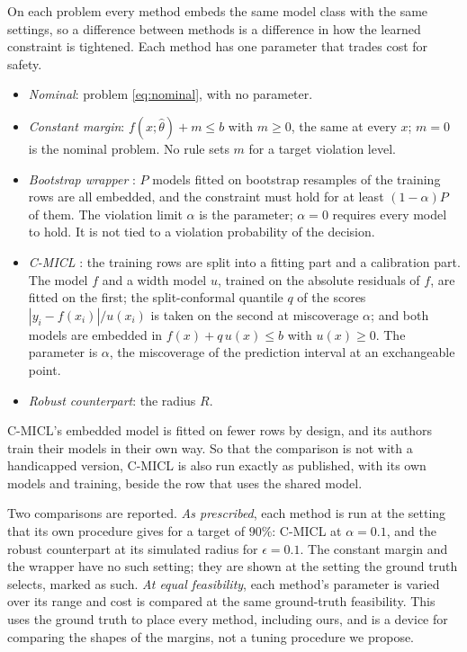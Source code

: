 On each problem every method embeds the same model class with the same
settings, so a difference between methods is a difference in how the learned
constraint is tightened. Each method has one parameter that trades cost for
safety.
\begin{itemize}
  \item \emph{Nominal}: problem \eqref{eq:nominal}, with no parameter.
  \item \emph{Constant margin}: $f(x;\hat\theta) + m \le b$ with $m \ge 0$,
    the same at every $x$; $m = 0$ is the nominal problem. No rule sets $m$
    for a target violation level.
  \item \emph{Bootstrap wrapper} \citep{maragno2025mixed}: $P$ models fitted
    on bootstrap resamples of the training rows are all embedded, and the
    constraint must hold for at least $(1-\alpha)P$ of them. The violation
    limit $\alpha$ is the parameter; $\alpha = 0$ requires every model to
    hold. It is not tied to a violation probability of the decision.
  \item \emph{C-MICL} \citep{ovalle2025cmicl}: the training rows are split
    into a fitting part and a calibration part. The model $f$ and a width
    model $u$, trained on the absolute residuals of $f$, are fitted on the
    first; the split-conformal quantile $q$ of the scores
    $|y_i - f(x_i)|/u(x_i)$ is taken on the second at miscoverage $\alpha$;
    and both models are embedded in $f(x) + q\,u(x) \le b$ with
    $u(x) \ge 0$. The parameter is $\alpha$, the miscoverage of the
    prediction interval at an exchangeable point.
  \item \emph{Robust counterpart}: the radius $R$.
\end{itemize}
C-MICL's embedded model is fitted on fewer rows by design, and its authors
train their models in their own way. So that the comparison is not with a
handicapped version, C-MICL is also run exactly as published, with its own
models and training, beside the row that uses the shared model.

Two comparisons are reported. \emph{As prescribed}, each method is run at the
setting that its own procedure gives for a target of $90\%$: C-MICL at
$\alpha = 0.1$, and the robust counterpart at its simulated radius for
$\epsilon = 0.1$. The constant margin and the wrapper have no such setting;
they are shown at the setting the ground truth selects, marked as such.
\emph{At equal feasibility}, each method's parameter is varied over its range
and cost is compared at the same ground-truth feasibility. This uses the
ground truth to place every method, including ours, and is a device for
comparing the shapes of the margins, not a tuning procedure we propose.


